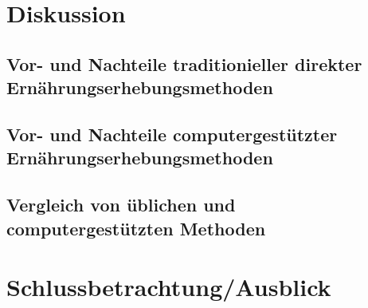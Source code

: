 \section{Diskussion}

\subsection{Vor- und Nachteile traditionieller direkter Ernährungserhebungsmethoden}

\subsection{Vor- und Nachteile computergestützter Ernährungserhebungsmethoden}

\subsection{Vergleich von üblichen und computergestützten Methoden}



\section{Schlussbetrachtung/Ausblick}
